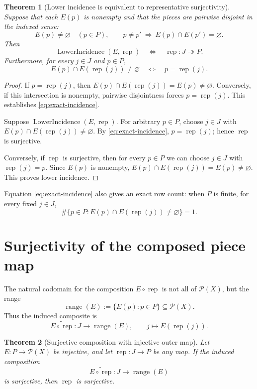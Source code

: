 \documentclass[11pt, letterpaper]{nyjm}
\newtheorem{theorem}{Theorem}[section]
\newcommand{\range}{\operatorname{range}}
\newcommand{\rep}{\operatorname{rep}}
\newcommand{\LowerIncidence}{\operatorname{LowerIncidence}}
\begin{document}
\begin{theorem}[Lower incidence is equivalent to representative
	surjectivity]\label{thm:lower-surjectivity}
	Suppose that each $E(p)$ is nonempty and that the pieces are pairwise
	disjoint in the indexed sense:
	\[
	E(p)\ne\varnothing\quad(p\in P),\qquad
	p\ne p'\ \Longrightarrow\ E(p)\cap E(p')=\varnothing.
	\]
	Then
	\begin{equation}\label{eq:iff-surj}
		\boxed{
			\LowerIncidence(E,\rep)
			\quad\Longleftrightarrow\quad
			\rep:J\twoheadrightarrow P.}
	\end{equation}
	Furthermore, for every $j\in J$ and $p\in P$,
	\begin{equation}\label{eq:exact-incidence}
		E(p)\cap E(\rep(j))\ne\varnothing
		\quad\Longleftrightarrow\quad p=\rep(j).
	\end{equation}
\end{theorem}

\begin{proof}
	If $p=\rep(j)$, then
	$E(p)\cap E(\rep(j))=E(p)\ne\varnothing$.
	Conversely, if this intersection is nonempty, pairwise disjointness
	forces $p=\rep(j)$. This establishes \eqref{eq:exact-incidence}.
	
	Suppose $\LowerIncidence(E,\rep)$. For arbitrary $p\in P$,
	choose $j\in J$ with
	$E(p)\cap E(\rep(j))\ne\varnothing$. By
	\eqref{eq:exact-incidence}, $p=\rep(j)$; hence $\rep$ is surjective.
	
	Conversely, if $\rep$ is surjective, then for every $p\in P$ we can
	choose $j\in J$ with $\rep(j)=p$. Since $E(p)$ is nonempty,
	$E(p)\cap E(\rep(j))=E(p)\ne\varnothing$. This proves lower incidence.
\end{proof}

\noindent
Equation \eqref{eq:exact-incidence} also gives an exact row count:
when $P$ is finite, for every fixed $j\in J$,
\[
\#\{p\in P:E(p)\cap E(\rep(j))\ne\varnothing\}=1.
\]


\section{Surjectivity of the composed piece map}

The natural codomain for the composition $E\circ\rep$ is not all of
$\mathcal P(X)$, but the range
\[
\range(E):=\{E(p):p\in P\}\subseteq\mathcal P(X).
\]
Thus the induced composite is
\[
\widetilde{E\circ\rep}:J\longrightarrow\range(E),
\qquad j\longmapsto E(\rep(j)).
\]

\begin{theorem}[Surjective composition with injective outer
	map]\label{thm:composite}
	Let $E:P\to\mathcal P(X)$ be injective, and let
	$\rep:J\to P$ be any map. If the induced composition
	\[
	\widetilde{E\circ\rep}:J\longrightarrow\range(E)
	\]
	is surjective, then $\rep$ is surjective.
\end{theorem}
\end{document}
